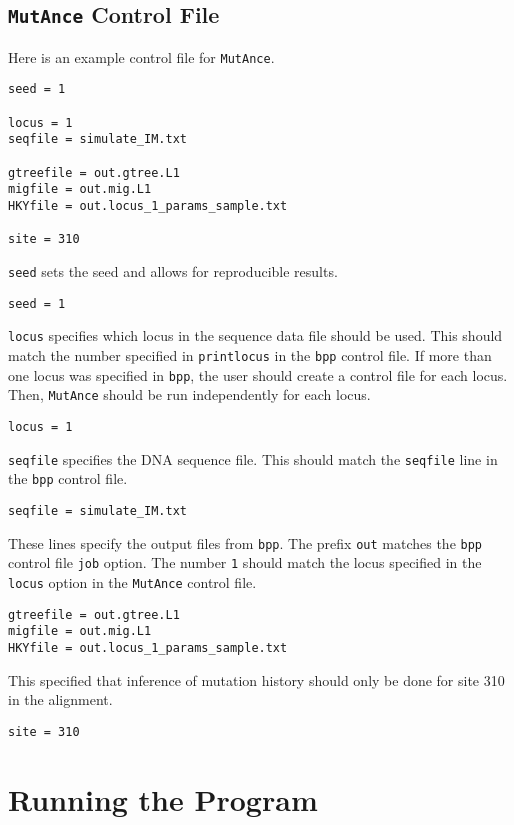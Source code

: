 \documentclass[11pt]{article}
\begin{document}
\subsection{\texttt{MutAnce} Control File}
Here is an example control file for \texttt{MutAnce}.
\begin{Verbatim}[frame=single, fontsize=\small]
seed = 1

locus = 1
seqfile = simulate_IM.txt

gtreefile = out.gtree.L1
migfile = out.mig.L1
HKYfile = out.locus_1_params_sample.txt

site = 310
\end{Verbatim}
\texttt{seed} sets the seed and allows for reproducible results. 
\begin{Verbatim}[frame=single, fontsize=\small]
seed = 1
\end{Verbatim}
\texttt{locus} specifies which locus in the sequence data file should be used. 
This should match the number specified in \texttt{printlocus} in the \texttt{bpp} control file. 
If more than one locus was specified in \texttt{bpp}, the user should create a control file for each locus. Then, \texttt{MutAnce} should be run independently for each locus. 
\begin{Verbatim}[frame=single, fontsize=\small]
locus = 1
\end{Verbatim}
\texttt{seqfile} specifies the DNA sequence file. This should match the \texttt{seqfile} line in the \texttt{bpp} control file.
\begin{Verbatim}[frame=single, fontsize=\small]
seqfile = simulate_IM.txt
\end{Verbatim}
These lines specify the output files from \texttt{bpp}. The prefix \texttt{out} matches the \texttt{bpp} control file \texttt{job} option. The number \texttt{1} should match the locus specified in the \texttt{locus} option in the \texttt{MutAnce} control file.
\begin{Verbatim}[frame=single, fontsize=\small]
gtreefile = out.gtree.L1
migfile = out.mig.L1
HKYfile = out.locus_1_params_sample.txt 
\end{Verbatim}
This specified that inference of mutation history should only be done for site 310 in the alignment.
\begin{Verbatim}[frame=single, fontsize=\small]
site = 310
\end{Verbatim}

\section{Running the Program}
\end{document}
